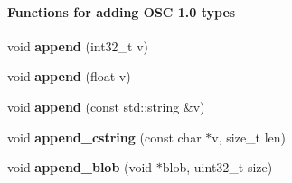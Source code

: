 \begin{Indent}\paragraph*{Functions for adding OSC 1.0 types}
\begin{DoxyCompactItemize}
\item 
\hypertarget{classtnyosc_1_1_message_ab12726122ccf535f65022ff6f88dd838}{
void {\bfseries append} (int32\_\-t v)}
\label{classtnyosc_1_1_message_ab12726122ccf535f65022ff6f88dd838}

\item 
\hypertarget{classtnyosc_1_1_message_a2a1d45d1e2877dc69fd4ec162ecad237}{
void {\bfseries append} (float v)}
\label{classtnyosc_1_1_message_a2a1d45d1e2877dc69fd4ec162ecad237}

\item 
\hypertarget{classtnyosc_1_1_message_ad66a2b9af7da82725f0a0ceb6969e18a}{
void {\bfseries append} (const std::string \&v)}
\label{classtnyosc_1_1_message_ad66a2b9af7da82725f0a0ceb6969e18a}

\item 
\hypertarget{classtnyosc_1_1_message_a74da2a0e90e0485551a678d401d0f756}{
void {\bfseries append\_\-cstring} (const char $\ast$v, size\_\-t len)}
\label{classtnyosc_1_1_message_a74da2a0e90e0485551a678d401d0f756}

\item 
\hypertarget{classtnyosc_1_1_message_a94cdec76e625fd4a8f11c250b16a3021}{
void {\bfseries append\_\-blob} (void $\ast$blob, uint32\_\-t size)}
\label{classtnyosc_1_1_message_a94cdec76e625fd4a8f11c250b16a3021}

\end{DoxyCompactItemize}
\end{Indent}
